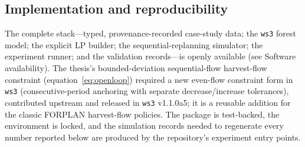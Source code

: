 \hypertarget{implementation-and-reproducibility}{%
\subsection{Implementation and reproducibility}\label{implementation-and-reproducibility}}

The complete stack---typed, provenance-recorded case-study data; the \texttt{ws3} forest model; the explicit LP builder; the sequential-replanning simulator; the experiment runner; and the validation records---is openly available (see Software availability). The thesis's bounded-deviation sequential-flow harvest-flow constraint (equation~\eqref{eq:openloop}) required a new even-flow constraint form in \texttt{ws3} (consecutive-period anchoring with separate decrease/increase tolerances), contributed upstream and released in \texttt{ws3} v1.1.0a5; it is a reusable addition for the classic FORPLAN harvest-flow policies. The package is test-backed, the environment is locked, and the simulation records needed to regenerate every number reported below are produced by the repository's experiment entry points.
